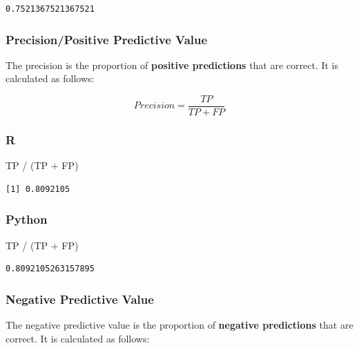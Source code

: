 \documentclass[
  letterpaper,
]{krantz}
\newenvironment{Shaded}{}{}
\newcommand{\NormalTok}[1]{#1}
\newcommand{\OperatorTok}[1]{\textcolor[rgb]{0.40,0.40,0.40}{#1}}
\newcommand{\SpecialCharTok}[1]{\textcolor[rgb]{0.25,0.44,0.63}{#1}}
\begin{document}
\begin{verbatim}
0.7521367521367521
\end{verbatim}

\subsubsection{Precision/Positive Predictive
Value}\label{precisionpositive-predictive-value}

The precision is the proportion of \textbf{positive predictions} that
are correct. It is calculated as follows:

\[Precision = \frac{TP}{TP + FP}\]

\subsubsection{R}

\begin{Shaded}
\begin{Highlighting}[]
\NormalTok{TP }\SpecialCharTok{/}\NormalTok{ (TP }\SpecialCharTok{+}\NormalTok{ FP)}
\end{Highlighting}
\end{Shaded}

\begin{verbatim}
[1] 0.8092105
\end{verbatim}

\subsubsection{Python}

\begin{Shaded}
\begin{Highlighting}[]
\NormalTok{TP }\OperatorTok{/}\NormalTok{ (TP }\OperatorTok{+}\NormalTok{ FP)}
\end{Highlighting}
\end{Shaded}

\begin{verbatim}
0.8092105263157895
\end{verbatim}

\subsubsection{Negative Predictive
Value}\label{negative-predictive-value}

The negative predictive value is the proportion of \textbf{negative
predictions} that are correct. It is calculated as follows:
\end{document}
